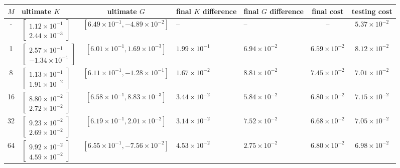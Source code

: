 \documentclass{article}
\begin{document}
\begin{table}[h!]
	\begin{center}
		\begin{tabular}{|c|m{3.3cm}|c|m{1.7cm}|m{1.7cm}|c|c|} 
			\hline
			$M$ & ultimate $K$ & ultimate $G$ & final $K$ difference & final $G$ difference & final cost & testing cost \\ 
			\hline
			- & $\begin{bmatrix}1.12\times 10^{-1} \\ 2.44\times 10^{-3}\end{bmatrix}$ & $[6.49\times 10^{-1}, -4.89\times 10^{-2}]$ & -- & -- & -- & $5.37\times 10^{-2}$\\
			\hline
			\hline
			1 & $\begin{bmatrix}2.57\times 10^{-1} \\ -1.34\times 10^{-1}\end{bmatrix}$ & $[6.01\times 10^{-1}, 1.69\times 10^{-3}]$ & $1.99\times 10^{-1}$ & $6.94\times 10^{-2}$ & $6.59\times 10^{-2}$ & $8.12\times 10^{-2}$\\ 
			\hline
			8 & $\begin{bmatrix}1.13\times 10^{-1} \\ 1.91\times 10^{-2}\end{bmatrix}$ & $[6.11\times 10^{-1}, -1.28\times 10^{-1}]$ & $1.67\times 10^{-2}$ & $8.81\times 10^{-2}$ & $7.45\times 10^{-2}$ & $7.01\times 10^{-2}$\\ 
			\hline
			16 & $\begin{bmatrix}8.80\times 10^{-2} \\ 2.72\times 10^{-2}\end{bmatrix}$ & $[6.58\times 10^{-1}, 8.83\times 10^{-3}]$ & $3.44\times 10^{-2}$ & $5.84\times 10^{-2}$ & $6.80\times 10^{-2}$ & $7.15\times 10^{-2}$\\ 
			\hline
			32 & $\begin{bmatrix}9.23\times 10^{-2} \\ 2.69\times 10^{-2}\end{bmatrix}$ & $[6.19\times 10^{-1}, 2.01\times 10^{-2}]$ & $3.14\times 10^{-2}$ & $7.52\times 10^{-2}$ & $6.68\times 10^{-2}$ & $7.05\times 10^{-2}$\\ 
			\hline
			64 & $\begin{bmatrix}9.92\times 10^{-2} \\ 4.59\times 10^{-2}\end{bmatrix}$ & $[6.55\times 10^{-1}, -7.56\times 10^{-2}]$ & $4.53\times 10^{-2}$ & $2.75\times 10^{-2}$ & $6.80\times 10^{-2}$ & $6.98\times 10^{-2}$\\

\end{tabular}
\end{center}
\end{table}
\end{document}

